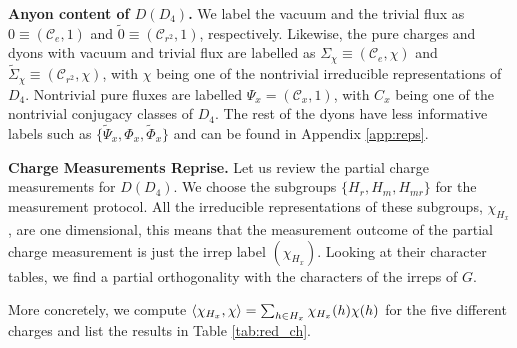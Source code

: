 \documentclass[two column]{article}
\newcommand{\caro}[1]{\textcolor{red}{[#1]}}
\newcommand{\jovan}[1]{\textcolor{blue}{[#1]}}
\begin{document}
\textbf{Anyon content of $D(D_4)$.} We label the vacuum and the trivial flux as $0 \equiv (\mathcal{C}_e, 1)$ and $\tilde 0 \equiv (\mathcal{C}_{r^2}, 1)$, respectively. Likewise, the pure charges and dyons with vacuum and trivial flux are labelled as $\Sigma_{\chi} \equiv (\mathcal{C}_e, \chi)$ and $\tilde{\Sigma}_{\chi} \equiv (\mathcal{C}_{r^2}, \chi)$, with $\chi$ being one of the nontrivial irreducible representations of $D_4$.
Nontrivial pure fluxes are labelled $\Psi_x = (\mathcal{C}_x, 1)$, with $C_x$ being one of the nontrivial conjugacy classes of $D_4$. The rest of the dyons have less informative labels such as $\{\tilde{\Psi}_x, \Phi_x, \tilde{\Phi}_x\}$ and can be found in Appendix \ref{app:reps}.

\textbf{Charge Measurements Reprise.}
Let us review the partial charge measurements for $D(D_4)$.
We choose the subgroups $\{H_r, H_m, H_{mr}\}$ for the measurement protocol. All the irreducible representations of these subgroups, $\chi_{H_x}$, are one dimensional, this means that the measurement outcome of the partial charge measurement is just the irrep label $(\chi_{H_x})$. Looking at their character tables, we find a partial orthogonality with the characters of the irreps of $G$. 



More concretely, we compute $ \braket{\chi_{H_x}, \chi} = \sum_{h\in H_x} \chi_{H_x}(h)\chi(h)$ for the five different charges and list the results in Table \ref{tab:red_ch}.
\end{document}

